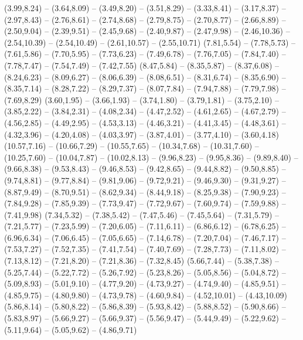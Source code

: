 \expandafter\def\csname geo:fluss:Ems\endcsname{
  (3.99,8.24) -- (3.64,8.09) -- (3.49,8.20) -- (3.51,8.29) -- (3.33,8.41) -- (3.17,8.37) -- (2.97,8.43) -- (2.76,8.61) -- (2.74,8.68) -- (2.79,8.75) -- (2.70,8.77) -- (2.66,8.89) -- (2.50,9.04) -- (2.39,9.51) -- (2.45,9.68) -- (2.40,9.87) -- (2.47,9.98) -- (2.46,10.36) -- (2.54,10.39) -- (2.54,10.49) -- (2.61,10.57) -- (2.55,10.71)}
\expandafter\def\csname geo:fluss:WeisseElster\endcsname{
  (7.81,5.54) -- (7.78,5.73) -- (7.61,5.86) -- (7.70,5.95) -- (7.73,6.23) -- (7.49,6.78) -- (7.76,7.05) -- (7.84,7.40) -- (7.78,7.47) -- (7.54,7.49) -- (7.42,7.55)}
\expandafter\def\csname geo:fluss:Mulde\endcsname{
  (8.47,5.84) -- (8.35,5.87) -- (8.37,6.08) -- (8.24,6.23) -- (8.09,6.27) -- (8.06,6.39) -- (8.08,6.51) -- (8.31,6.74) -- (8.35,6.90) -- (8.35,7.14) -- (8.28,7.22) -- (8.29,7.37) -- (8.07,7.84) -- (7.94,7.88) -- (7.79,7.98) -- (7.69,8.29)}
\expandafter\def\csname geo:fluss:Neckar\endcsname{
  (3.60,1.95) -- (3.66,1.93) -- (3.74,1.80) -- (3.79,1.81) -- (3.75,2.10) -- (3.85,2.22) -- (3.84,2.31) -- (4.08,2.34) -- (4.47,2.52) -- (4.61,2.65) -- (4.67,2.79) -- (4.56,2.85) -- (4.49,2.95) -- (4.53,3.13) -- (4.46,3.21) -- (4.41,3.45) -- (4.48,3.61) -- (4.32,3.96) -- (4.20,4.08) -- (4.03,3.97) -- (3.87,4.01) -- (3.77,4.10) -- (3.60,4.18)}
\expandafter\def\csname geo:fluss:Spree\endcsname{
  (10.57,7.16) -- (10.66,7.29) -- (10.55,7.65) -- (10.34,7.68) -- (10.31,7.60) -- (10.25,7.60) -- (10.04,7.87) -- (10.02,8.13) -- (9.96,8.23) -- (9.95,8.36) -- (9.89,8.40) -- (9.66,8.38) -- (9.53,8.43) -- (9.46,8.53) -- (9.42,8.65) -- (9.44,8.82) -- (9.50,8.85) -- (9.74,8.81) -- (9.77,8.84) -- (9.81,9.06) -- (9.72,9.21) -- (9.46,9.30) -- (9.31,9.27) -- (8.87,9.49) -- (8.70,9.51) -- (8.62,9.34) -- (8.44,9.18) -- (8.25,9.38) -- (7.90,9.23) -- (7.84,9.28) -- (7.85,9.39) -- (7.73,9.47) -- (7.72,9.67) -- (7.60,9.74) -- (7.59,9.88) -- (7.41,9.98)}
\expandafter\def\csname geo:fluss:Saale\endcsname{
  (7.34,5.32) -- (7.38,5.42) -- (7.47,5.46) -- (7.45,5.64) -- (7.31,5.79) -- (7.21,5.77) -- (7.23,5.99) -- (7.20,6.05) -- (7.11,6.11) -- (6.86,6.12) -- (6.78,6.25) -- (6.96,6.34) -- (7.06,6.45) -- (7.05,6.65) -- (7.14,6.78) -- (7.20,7.04) -- (7.46,7.17) -- (7.53,7.27) -- (7.52,7.35) -- (7.41,7.54) -- (7.40,7.69) -- (7.28,7.73) -- (7.11,8.02) -- (7.13,8.12) -- (7.21,8.20) -- (7.21,8.36) -- (7.32,8.45)}
\expandafter\def\csname geo:fluss:Aller\endcsname{
  (5.66,7.44) -- (5.38,7.38) -- (5.25,7.44) -- (5.22,7.72) -- (5.26,7.92) -- (5.23,8.26) -- (5.05,8.56) -- (5.04,8.72) -- (5.09,8.93) -- (5.01,9.10) -- (4.77,9.20) -- (4.73,9.27) -- (4.74,9.40) -- (4.85,9.51) -- (4.85,9.75) -- (4.80,9.80) -- (4.73,9.78) -- (4.60,9.84) -- (4.52,10.01) -- (4.43,10.09)
  (5.86,8.14) -- (5.80,8.22) -- (5.86,8.39) -- (5.93,8.42) -- (5.88,8.52) -- (5.90,8.66) -- (5.83,8.97) -- (5.66,9.27) -- (5.66,9.37) -- (5.56,9.47) -- (5.44,9.49) -- (5.22,9.62) -- (5.11,9.64) -- (5.05,9.62) -- (4.86,9.71)}
